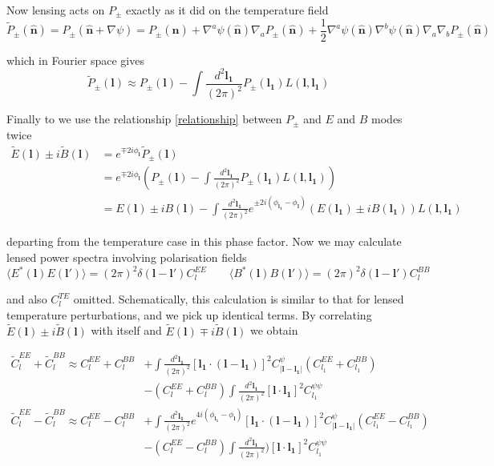 \documentclass[a4paper,10pt]{article}
\renewcommand{\v}[1]{\mathbf{#1}}
\newcommand{\half}{\frac{1}{2}}
\newcommand{\finttwo}[1]{\int \frac{d^2 \v{#1}}{(2\pi)^2}}
\newcommand{\unit}[1]{\hat{\v{#1}}}
\begin{document}
Now lensing acts on $P_{\pm}$ exactly as it did on the temperature field 
\begin{equation}
\tilde{P}_{\pm}(\unit{n}) = P_{\pm}(\unit{n}+\nabla\psi) =P_{\pm}(\unit{n})+\nabla^a\psi(\unit{n})\nabla_aP_{\pm}(\unit{n})+\half\nabla^a\psi(\unit{n})\nabla^b\psi(\unit{n})\nabla_a\nabla_bP_{\pm}(\unit{n})
\end{equation}

which in Fourier space gives
\begin{equation}
\tilde{P}_{\pm}(\v{l}) \approx P_{\pm}(\v{l}) - \finttwo{l_1} P_{\pm}(\v{l_1})L(\v{l},\v{l_1})
\end{equation}

Finally to we use the relationship \ref{relationship} between $P_\pm$ and $E$ and $B$ modes twice
\begin{equation}\begin{split}
\tilde{E}(\v{l})\pm i\tilde{B}(\v{l}) &= e^{\mp 2i\phi_\v{l}}\tilde{P}_{\pm}(\v{l})\\
&=e^{\mp 2i\phi_\v{l}}\left(P_{\pm}(\v{l}) - \finttwo{l_1} P_{\pm}(\v{l_1})L(\v{l},\v{l_1})\right)\\
&=E(\v{l})\pm iB(\v{l})-\finttwo{l_1} e^{\pm 2i(\phi_\v{l_1}-\phi_\v{l})}(E(\v{l_1})\pm iB(\v{l_1}))L(\v{l},\v{l_1})
\label{lensedEBmodes}
\end{split}\end{equation}



departing from the temperature case in this phase factor. Now we may calculate lensed power spectra involving polarisation fields
\begin{equation}
\langle E^*(\v{l})E(\v{l}')\rangle = (2\pi)^2\delta(\v{l}-\v{l}')C_l^{EE} \qquad \langle B^*(\v{l})B(\v{l}')\rangle = (2\pi)^2\delta(\v{l}-\v{l}')C_l^{BB}
\end{equation}

and also $C_l^{TE}$ omitted. Schematically, this calculation is similar to that for lensed temperature perturbations, and we pick up identical terms. By correlating $\tilde{E}(\v{l})\pm i\tilde{B}(\v{l})$ with itself and $\tilde{E}(\v{l})\mp i\tilde{B}(\v{l})$ we obtain

\begin{equation}\begin{split}
\tilde{C}_l^{EE}+\tilde{C}_l^{BB} \approx C_l^{EE}+C_l^{BB}&+\finttwo{l_1}[ \v{l_1}\cdot(\v{l}-\v{l_1})]^2 C^\psi_{|\v{l}-\v{l_1}|}(C_{l_1}^{EE}+C_{l_1}^{BB}) \\
&- (C_{l}^{EE}+C_{l}^{BB})\finttwo{l_1} [\v{l}\cdot\v{l_1}]^2C_{l_1}^{\psi\psi}\\
\tilde{C}_l^{EE}-\tilde{C}_l^{BB} \approx C_l^{EE}-C_l^{BB}&+\finttwo{l_1}e^{4i(\phi_{\v{l_1}}-\phi_\v{l})}[ \v{l_1}\cdot(\v{l}-\v{l_1})]^2 C^\psi_{|\v{l}-\v{l_1}|}(C_{l_1}^{EE}-C_{l_1}^{BB})\\
&- (C_{l}^{EE}-C_{l}^{BB})\finttwo{l_1} )[\v{l}\cdot\v{l_1}]^2C_{l_1}^{\psi\psi}
\end{split}\end{equation}
\end{document}
